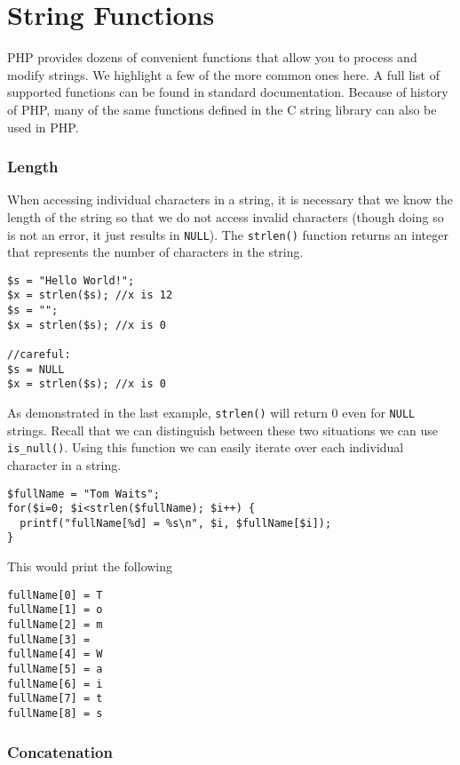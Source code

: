 \section{String Functions}

PHP provides dozens of convenient functions that allow 
you to process and modify strings.  We highlight a few 
of the more common ones here.  A full list of supported 
functions can be found in standard documentation.  Because
of history of PHP, many of the same functions defined in
the C string library can also be used in PHP.

\subsubsection{Length}

When accessing individual characters in a string, it
is necessary that we know the length of the string so
that we do not access invalid characters (though doing
so is not an error, it just results in \texttt{NULL}).
The \texttt{strlen()} function returns an
integer that represents the number of characters in the
string.  

\begin{verbatim}
$s = "Hello World!";
$x = strlen($s); //x is 12
$s = "";
$x = strlen($s); //x is 0

//careful:
$s = NULL
$x = strlen($s); //x is 0
\end{verbatim}

As demonstrated in the last example, \texttt{strlen()}
will return 0 even for \texttt{NULL} strings.
Recall that we can distinguish between these two situations
we can use \texttt{is_null()}.  Using this function
we can easily iterate over each individual character in a string.

\begin{verbatim}
$fullName = "Tom Waits";
for($i=0; $i<strlen($fullName); $i++) {
  printf("fullName[%d] = %s\n", $i, $fullName[$i]);
}
\end{verbatim}

This would print the following

\begin{verbatim}
fullName[0] = T
fullName[1] = o
fullName[2] = m
fullName[3] =  
fullName[4] = W
fullName[5] = a
fullName[6] = i
fullName[7] = t
fullName[8] = s
\end{verbatim}

\subsubsection{Concatenation}

